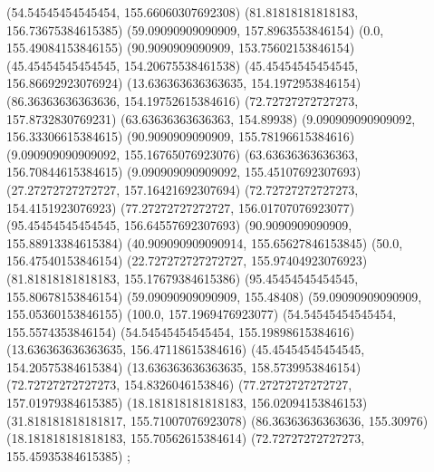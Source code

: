 {{{		(54.54545454545454, 155.66060307692308)
		(81.81818181818183, 156.73675384615385)
		(59.09090909090909, 157.8963553846154)
		(0.0, 155.49084153846155)
		(90.9090909090909, 153.75602153846154)
		(45.45454545454545, 154.20675538461538)
		(45.45454545454545, 156.86692923076924)
		(13.636363636363635, 154.1972953846154)
		(86.36363636363636, 154.19752615384616)
		(72.72727272727273, 157.8732830769231)
		(63.63636363636363, 154.89938)
		(9.090909090909092, 156.33306615384615)
		(90.9090909090909, 155.78196615384616)
		(9.090909090909092, 155.16765076923076)
		(63.63636363636363, 156.70844615384615)
		(9.090909090909092, 155.45107692307693)
		(27.27272727272727, 157.16421692307694)
		(72.72727272727273, 154.4151923076923)
		(77.27272727272727, 156.01707076923077)
		(95.45454545454545, 156.64557692307693)
		(90.9090909090909, 155.88913384615384)
		(40.909090909090914, 155.65627846153845)
		(50.0, 156.47540153846154)
		(22.727272727272727, 155.97404923076923)
		(81.81818181818183, 155.17679384615386)
		(95.45454545454545, 155.80678153846154)
		(59.09090909090909, 155.48408)
		(59.09090909090909, 155.05360153846155)
		(100.0, 157.1969476923077)
		(54.54545454545454, 155.5574353846154)
		(54.54545454545454, 155.19898615384616)
		(13.636363636363635, 156.47118615384616)
		(45.45454545454545, 154.20575384615384)
		(13.636363636363635, 158.5739953846154)
		(72.72727272727273, 154.8326046153846)
		(77.27272727272727, 157.01979384615385)
		(18.181818181818183, 156.02094153846153)
		(31.818181818181817, 155.71007076923078)
		(86.36363636363636, 155.30976)
		(18.181818181818183, 155.70562615384614)
		(72.72727272727273, 155.45935384615385)
	};

}}
